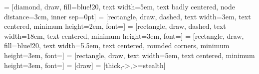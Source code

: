  = [diamond, draw, fill=blue!20, 
    text width=5em, text badly centered, node distance=3cm, inner sep=0pt]
 = [rectangle, draw, dashed, text width=3em, text centered, minimum height=2em, font=\footnotesize]
 = [rectangle, draw, dashed, text width=18em, text centered, minimum height=3em, font=\footnotesize]
 = [rectangle, draw, fill=blue!20, 
    text width=5.5em, text centered, rounded corners, minimum height=3em, font=\footnotesize]
 = [rectangle, draw, text width=5em, text centered, minimum height=3em, font=\footnotesize]
 = [draw]
 = [thick,->,>=stealth]

